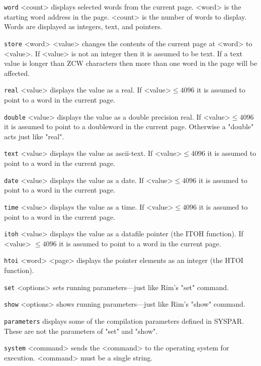 \documentclass[11pt,a4paper]{report}
\begin{document}
\verb|word| <count>\>
displays selected words from the current page.
<word> is the starting word address in the page.
<count> is the number of words to display.
Words are displayed as integers, text, and pointers.
 
\verb|store| <word> <value>\>
changes the contents of the current page at <word> to <value>.
If <value> is not an integer then it is assumed to be text.
If a text value is longer than ZCW characters then
more than one word in the page will be affected.
 
\verb|real| <value>\>
displays the value as a real.  If <value>$\le 4096$ it is
assumed to point to a word in the current page.
 
\verb|double| <value>\>
displays the value as a double precision real.  If <value>$\le 4096$ it is
assumed to point to a doubleword in the current page. Otherwise
a "double" acts just like "real".
 

\verb|text| <value>\>
displays the value as ascii-text.  If <value>$\le 4096$ it is
assumed to point to a word in the current page.
 
\verb|date| <value>\>
displays the value as a date. If <value>$\le 4096$ it is
assumed to point to a word in the current page.
 
\verb|time| <value>\>
displays the value as a time. If <value>$\le 4096$ it is
assumed to point to a word in the current page.
 
\verb|itoh| <value>\>
displays the value as a datafile pointer (the ITOH function).
If <value> $\le 4096$ it is
assumed to point to a word in the current page.
 
\verb|htoi| <word> <page>\>
displays the pointer elements as an integer (the HTOI function).
 
\verb|set| <options>\>
sets running parameters---just like Rim's "set" command.
 
\verb|show| <options>\>
shows running parameters---just like Rim's "show" command.
 
\verb|parameters|
displays some of the compilation parameters defined in SYSPAR.
These are not the parameters of "set" and "show".
 
\verb|system| <command>\>
sends the <command> to the operating system for execution.
<command> must be a single string.
 
 
\end{document}
